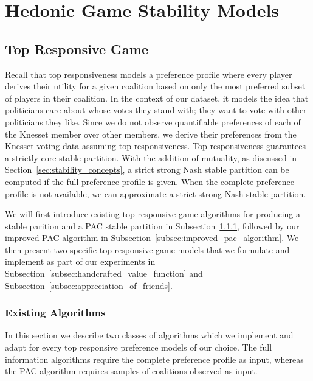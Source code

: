 
\chapter{Hedonic Game Stability Models}
\label{ch:hedonic}
\vspace{2em}

\section{Top Responsive Game}
\label{sec:top_responsive_game}
Recall that top responsiveness models a preference profile where every player
derives their utility for a given coalition based on only the most preferred
subset of players in their coalition.
In the context of our dataset, it models the idea that politicians care about
whose votes they stand with; they want to vote with other politicians they like.
Since we do not observe quantifiable preferences of each of the Knesset member
over other members, we derive their preferences from the Knesset voting data
assuming top responsiveness.
Top responsiveness guarantees a strictly core stable partition.
With the addition of mutuality, as discussed in Section~\ref{sec:stability_concepts},
a strict strong Nash stable partition can be computed if the full preference
profile is given.
When the complete preference profile is not available, we can approximate
a strict strong Nash stable partition.

We will first introduce existing top responsive game algorithms for producing a
stable parition and a PAC stable partition in Subsection~\ref{subsec:algorithms},
followed by our improved PAC algorithm in
Subsection~\ref{subsec:improved_pac_algorithm}.
We then present two specific top responsive game models that we formulate and
implement as part of our experiments in
Subsection~\ref{subsec:handcrafted_value_function} and
Subsection~\ref{subsec:appreciation_of_friends}.

\subsection{Existing Algorithms}
\label{subsec:algorithms}
In this section we describe two classes of algorithms which we implement and adapt
for every top responsive preference models of our choice.
The full information algorithms require the complete preference profile as
input, whereas the PAC algorithm requires samples of coalitions observed as input.

